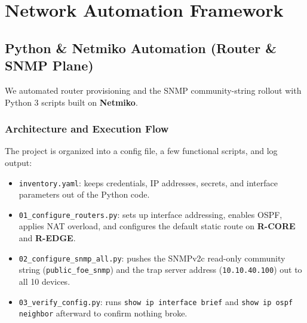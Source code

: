 \documentclass[11pt,a4paper]{article}
\newcommand{\hr}{\vspace{0.2cm}\noindent\hrulefill\vspace{0.2cm}}
\begin{document}
\hr

\section{Network Automation Framework}

\subsection{Python \& Netmiko Automation (Router \& SNMP Plane)}

We automated router provisioning and the SNMP community-string rollout with Python 3 scripts built on \textbf{Netmiko}.

\subsubsection{Architecture and Execution Flow}
The project is organized into a config file, a few functional scripts, and log output:
\begin{itemize}
    \item \texttt{inventory.yaml}: keeps credentials, IP addresses, secrets, and interface parameters out of the Python code.
    \item \texttt{01\_configure\_routers.py}: sets up interface addressing, enables OSPF, applies NAT overload, and configures the default static route on \textbf{R-CORE} and \textbf{R-EDGE}.
    \item \texttt{02\_configure\_snmp\_all.py}: pushes the SNMPv2c read-only community string (\texttt{public\_foe\_snmp}) and the trap server address (\texttt{10.10.40.100}) out to all 10 devices.
    \item \texttt{03\_verify\_config.py}: runs \texttt{show ip interface brief} and \texttt{show ip ospf neighbor} afterward to confirm nothing broke.
\end{itemize}
\end{document}
